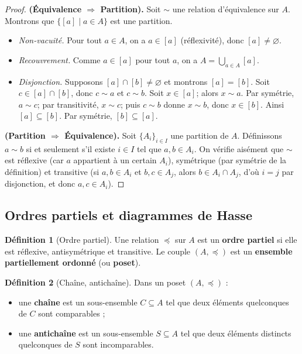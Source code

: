 \documentclass[12pt,a4paper,openany]{book}
\theoremstyle{definition}
\newtheorem{definition}{Définition}[chapter]
\theoremstyle{plain}
\theoremstyle{remark}
\begin{document}
\begin{proof}
\textbf{(Équivalence $\Rightarrow$ Partition).}
Soit $\sim$ une relation d'équivalence sur $A$. Montrons que
$\{[a] \mid a \in A\}$ est une partition.
\begin{itemize}
  \item \emph{Non-vacuité.} Pour tout $a \in A$, on a $a \in [a]$ (réflexivité), donc $[a] \neq \varnothing$.
  \item \emph{Recouvrement.} Comme $a \in [a]$ pour tout $a$, on a
    $A = \bigcup_{a \in A} [a]$.
  \item \emph{Disjonction.} Supposons $[a] \cap [b] \neq \varnothing$ et
    montrons $[a] = [b]$. Soit $c \in [a] \cap [b]$, donc $c \sim a$ et
    $c \sim b$. Soit $x \in [a]$; alors $x \sim a$. Par symétrie, $a \sim c$;
    par transitivité, $x \sim c$; puis $c \sim b$ donne $x \sim b$, donc
    $x \in [b]$. Ainsi $[a] \subseteq [b]$. Par symétrie, $[b] \subseteq [a]$.
\end{itemize}

\textbf{(Partition $\Rightarrow$ Équivalence).}
Soit $\{A_i\}_{i \in I}$ une partition de $A$. Définissons $a \sim b$ si et
seulement s'il existe $i \in I$ tel que $a, b \in A_i$. On vérifie aisément
que $\sim$ est réflexive (car $a$ appartient à un certain $A_i$), symétrique
(par symétrie de la définition) et transitive (si $a, b \in A_i$ et
$b, c \in A_j$, alors $b \in A_i \cap A_j$, d'où $i = j$ par disjonction,
et donc $a, c \in A_i$).
\end{proof}

\subsection{Ordres partiels et diagrammes de Hasse}\label{subsec:ordres}

\begin{definition}[Ordre partiel]\label{def:ordre-partiel}
Une relation $\preceq$ sur $A$ est un \textbf{ordre partiel} si elle est
réflexive, antisymétrique et transitive. Le couple $(A, \preceq)$ est un
\textbf{ensemble partiellement ordonné} (ou \textbf{poset}).
\end{definition}

\begin{definition}[Chaîne, antichaîne]\label{def:chaine-antichaine}
Dans un poset $(A, \preceq)$ :
\begin{itemize}
  \item une \textbf{chaîne} est un sous-ensemble $C \subseteq A$ tel que
    deux éléments quelconques de $C$ sont comparables ;
  \item une \textbf{antichaîne} est un sous-ensemble $S \subseteq A$ tel que
    deux éléments distincts quelconques de $S$ sont incomparables.
\end{itemize}
\end{definition}
\end{document}
